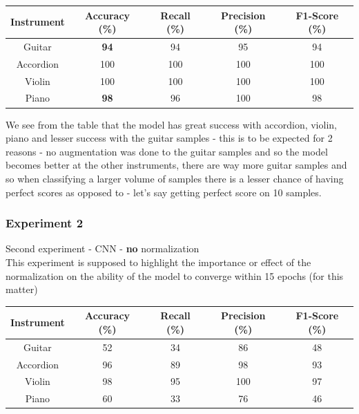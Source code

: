 \documentclass[a4paper]{article}
\begin{document}
\begin{table}[h]
\centering
\begin{adjustbox}{width=\linewidth}    
\begin{tabular}{c c c c c} %
\hline   
Instrument & Accuracy (\%) & Recall (\%) & Precision (\%) & F1-Score (\%) \\
\hline\hline
Guitar & \textbf{94} & 94 & 95 & 94\\
Accordion & 100  & 100 & 100 & 100\\
Violin & 100  & 100 & 100 & 100\\
Piano & \textbf{98}  & 96 & 100 & 98\\
\hline
\end{tabular}
\end{adjustbox}
\end{table}

We see from the table that the model has great success with accordion, violin, piano and lesser success with the guitar samples - this is to be expected for 2 reasons - no augmentation was done to the guitar samples and so the model becomes better at the other instruments, there are way more guitar samples and so when classifying a larger volume of samples there is a lesser chance of having perfect scores as opposed to - let's say getting perfect score on 10 samples.

\subsubsection{Experiment 2}
Second experiment - CNN - \textbf{no} normalization\\
\noindent This experiment is supposed to highlight the importance or effect of the normalization on the ability of the model to converge within 15 epochs (for this matter)

\begin{table}[h]
\centering
\begin{adjustbox}{width=\linewidth}    
\begin{tabular}{c c c c c} %
\hline   
Instrument & Accuracy (\%) & Recall (\%) & Precision (\%) & F1-Score (\%) \\
\hline\hline
Guitar & 52 & 34 & 86 & 48\\
Accordion & 96  & 89 & 98 & 93\\
Violin & 98  & 95 & 100 & 97\\
Piano & 60  & 33 & 76 & 46\\
\hline
\end{tabular}
\end{adjustbox}
\end{table}
\end{document}
